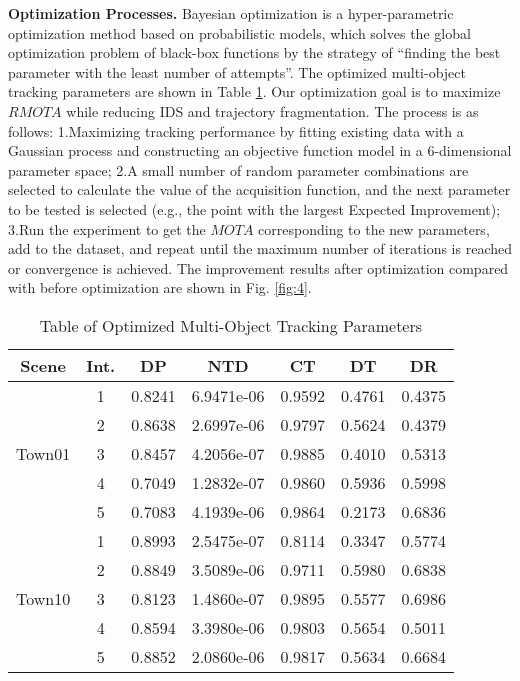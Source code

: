 \documentclass[lettersize,journal]{IEEEtran}
\begin{document}
\textbf{Optimization Processes.}
Bayesian optimization is a hyper-parametric optimization method based on probabilistic models, which solves the global optimization problem of black-box functions by the strategy of “finding the best parameter with the least number of attempts”.
The optimized multi-object tracking parameters are shown in Table \ref{tab:4}.
Our optimization goal is to maximize \(RMOTA\) while reducing IDS and trajectory fragmentation.
The process is as follows:
1.Maximizing tracking performance by fitting existing data with a Gaussian process and constructing an objective function model in a 6-dimensional parameter space; 
2.A small number of random parameter combinations are selected to calculate the value of the acquisition function, and the next parameter to be tested is selected (e.g., the point with the largest Expected Improvement); 
3.Run the experiment to get the \(MOTA\) corresponding to the new parameters, add to the dataset, and repeat until the maximum number of iterations is reached or convergence is achieved.
The improvement results after optimization compared with before optimization are shown in Fig. \ref{fig:4}. 

\begin{table}[t]
	\centering
	\caption{Table of Optimized Multi-Object Tracking Parameters}
	\label{tab:4}
	\renewcommand\arraystretch{1.3}
	\begin{tabular}{|c|c|c|c|c|c|c|}
		
		\hline
		Scene & Int. & DP & NTD & CT & DT & DR \\
		\hline
		\multirow{5}{*}{Town01} & 1 & 0.8241 & 6.9471e-06 & 0.9592 & 0.4761 & 0.4375 \\
		\cline{2-7}
		& 2 & 0.8638 & 2.6997e-06 & 0.9797 & 0.5624 & 0.4379 \\
		\cline{2-7}
		& 3 & 0.8457 & 4.2056e-07 & 0.9885 & 0.4010 & 0.5313 \\
		\cline{2-7}
		& 4 & 0.7049 & 1.2832e-07 & 0.9860 & 0.5936 & 0.5998 \\
		\cline{2-7}
		& 5 & 0.7083 & 4.1939e-06 & 0.9864 & 0.2173 & 0.6836 \\
		\hline
		\multirow{5}{*}{Town10} & 1 & 0.8993 & 2.5475e-07 & 0.8114 & 0.3347 & 0.5774 \\
		\cline{2-7}
		& 2 & 0.8849 & 3.5089e-06 & 0.9711 & 0.5980 & 0.6838 \\
		\cline{2-7}
		& 3 & 0.8123 & 1.4860e-07 & 0.9895 & 0.5577 & 0.6986 \\
		\cline{2-7}
		& 4 & 0.8594 & 3.3980e-06 & 0.9803 & 0.5654 & 0.5011 \\
		\cline{2-7}
		& 5 & 0.8852 & 2.0860e-06 & 0.9817 & 0.5634 & 0.6684 \\
		\hline
	\end{tabular}
\end{table}
\end{document}
